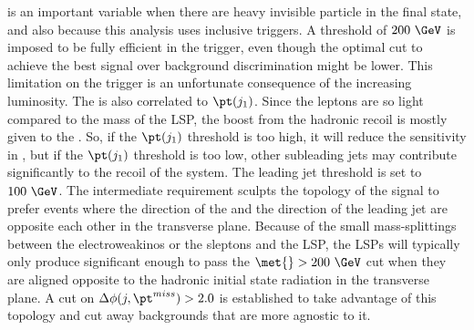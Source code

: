 \met{} is an important variable when there are heavy invisible particle in the final state, and also because this analysis uses inclusive \met{} triggers.  A \met{} threshold of $200~\GeV$ is imposed to be fully efficient in the \met{} trigger, even though the optimal cut to achieve the best signal over background discrimination might be lower.  This limitation on the trigger is an unfortunate consequence of the increasing luminosity.  The \met is also correlated to $\pt(j_1)$.  Since the leptons are so light compared to the mass of the LSP, the boost from the hadronic recoil is mostly given to the \met{}. So, if the $\pt(j_1)$ threshold is too high, it will reduce the sensitivity in \met{}, but if the $\pt(j_1)$ threshold is too low, other subleading jets may contribute significantly to the recoil of the system.  The leading jet \pt threshold is set to $100~\GeV$.  The intermediate \met{} requirement sculpts the topology of the signal to prefer events where the direction of the \met and the direction of the leading jet are opposite each other in the transverse plane.  Because of the small mass-splittings between the electroweakinos or the sleptons and the LSP, the LSPs will typically only produce significant enough \met{} to pass the $\met{} > 200~\GeV$  cut when they are aligned opposite to the hadronic initial state radiation in the transverse plane.  A cut on $\Delta\phi(j, \pt^{miss}) > 2.0$ is established to take advantage of this topology and cut away backgrounds that are more agnostic to it.  

